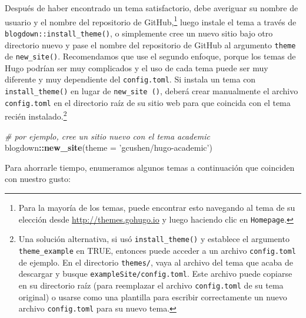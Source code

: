 \documentclass[12pt,]{krantz}
\makeatletter
\newenvironment{Shaded}{\begin{snugshade}}{\end{snugshade}}
\newcommand{\CommentTok}[1]{\textcolor[rgb]{0.56,0.35,0.01}{\textit{#1}}}
\newcommand{\DataTypeTok}[1]{\textcolor[rgb]{0.13,0.29,0.53}{#1}}
\newcommand{\KeywordTok}[1]{\textcolor[rgb]{0.13,0.29,0.53}{\textbf{#1}}}
\newcommand{\NormalTok}[1]{#1}
\newcommand{\OperatorTok}[1]{\textcolor[rgb]{0.81,0.36,0.00}{\textbf{#1}}}
\newcommand{\StringTok}[1]{\textcolor[rgb]{0.31,0.60,0.02}{#1}}
\newenvironment{kframe}{%
\medskip{}
\setlength{\fboxsep}{.8em}
 \def\at@end@of@kframe{}%
 \ifinner\ifhmode%
  \def\at@end@of@kframe{\end{minipage}}%
  \begin{minipage}{\columnwidth}%
 \fi\fi%
 \def\FrameCommand##1{\hskip\@totalleftmargin \hskip-\fboxsep
 \colorbox{shadecolor}{##1}\hskip-\fboxsep
     \hskip-\linewidth \hskip-\@totalleftmargin \hskip\columnwidth}%
 \MakeFramed {\advance\hsize-\width
   \@totalleftmargin\z@ \linewidth\hsize
   \@setminipage}}%
 {\par\unskip\endMakeFramed%
 \at@end@of@kframe}
\renewenvironment{Shaded}{\begin{kframe}}{\end{kframe}}
\theoremstyle{definition}
\theoremstyle{definition}
\theoremstyle{definition}
\theoremstyle{remark}
\makeatother
\begin{document}
Después de haber encontrado un tema satisfactorio, debe averiguar su
nombre de usuario y el nombre del repositorio de GitHub,\footnote{Para
  la mayoría de los temas, puede encontrar esto navegando al tema de su
  elección desde \url{http://themes.gohugo.io} y luego haciendo clic en
  \texttt{Homepage}.} luego instale el tema a través
de
\texttt{blogdown::install\_theme()}, o simplemente cree un nuevo sitio
bajo otro directorio nuevo y pase el nombre del repositorio de GitHub al
argumento \texttt{theme} de \texttt{new\_site()}. Recomendamos que use
el segundo enfoque, porque los temas de Hugo podrían ser muy complicados
y el uso de cada tema puede ser muy diferente y muy dependiente del
\texttt{config.toml}. Si instala un tema con \texttt{install\_theme()}
en lugar de \texttt{new\_site\ ()}, deberá crear manualmente el archivo
\texttt{config.toml} en el directorio raíz de su sitio web para que
coincida con el tema recién instalado.\footnote{Una solución
  alternativa, si usó \texttt{install\_theme()} y establece el argumento
  \texttt{theme\_example} en TRUE, entonces puede acceder a un archivo
  \texttt{config.toml} de ejemplo. En el directorio \texttt{themes/},
  vaya al archivo del tema que acaba de descargar y busque
  \texttt{exampleSite/config.toml}. Este archivo puede copiarse en su
  directorio raíz (para reemplazar el archivo \texttt{config.toml} de su
  tema original) o usarse como una plantilla para escribir correctamente
  un nuevo archivo \texttt{config.toml} para su nuevo tema.}

\begin{Shaded}
\begin{Highlighting}[]
\CommentTok{# por ejemplo, cree un sitio nuevo con el tema academic}
\NormalTok{blogdown}\OperatorTok{::}\KeywordTok{new_site}\NormalTok{(}\DataTypeTok{theme =} \StringTok{'gcushen/hugo-academic'}\NormalTok{)}
\end{Highlighting}
\end{Shaded}

Para ahorrarle tiempo, enumeramos algunos temas a continuación que
coinciden con nuestro gusto:
\end{document}
